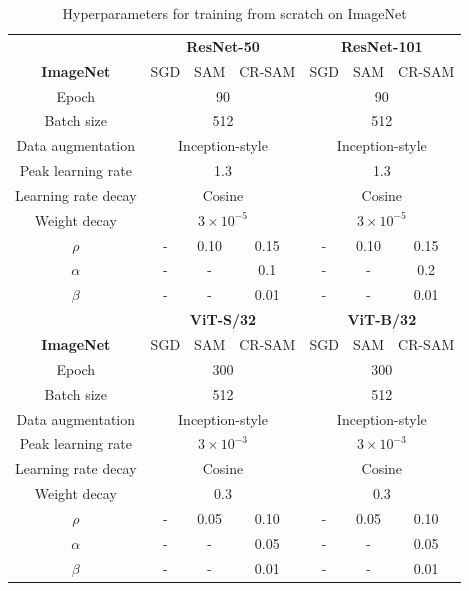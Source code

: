 \documentclass[letterpaper]{article} %
\theoremstyle{plain}
\theoremstyle{definition}
\begin{document}
 \begin{table}[h!]
\caption{\footnotesize Hyperparameters for training from scratch on ImageNet}
  \centering
  \small
  \begin{tabular}{c|ccc|ccc}
  \toprule
     & \multicolumn{3}{c|}{\textbf{ResNet-50 }} & \multicolumn{3}{c}{ \textbf{ResNet-101}} \\
   \textbf{ImageNet }  & SGD & SAM &CR-SAM& SGD & SAM &CR-SAM\\
   \midrule
   Epoch&\multicolumn{3}{c|}{90}&\multicolumn{3}{c}{90}\\
   Batch size&\multicolumn{3}{c|}{512}&\multicolumn{3}{c}{512}\\
   Data augmentation &\multicolumn{3}{c|}{Inception-style}&\multicolumn{3}{c}{Inception-style}\\
   Peak learning rate &\multicolumn{3}{c|}{1.3}&\multicolumn{3}{c}{1.3}\\
   Learning rate decay &\multicolumn{3}{c|}{Cosine}&\multicolumn{3}{c}{Cosine}\\
   Weight decay &\multicolumn{3}{c}{$3\times10^{-5}$}&\multicolumn{3}{c}{$3\times10^{-5}$}\\
   $\rho$ & -&0.10&0.15&-&0.10&0.15\\
   $\alpha$ &-&-&0.1&-&-&0.2\\
   $\beta$ &-&-&0.01&-&-&0.01\\
\midrule
   & \multicolumn{3}{c|}{\textbf{ViT-S/32}} & \multicolumn{3}{c}{ \textbf{ViT-B/32}} \\
   \textbf{ImageNet }  & SGD & SAM &CR-SAM& SGD & SAM &CR-SAM\\
   \midrule
   Epoch&\multicolumn{3}{c|}{300}&\multicolumn{3}{c}{300}\\
   Batch size&\multicolumn{3}{c|}{512}&\multicolumn{3}{c}{512}\\
   Data augmentation &\multicolumn{3}{c|}{Inception-style}&\multicolumn{3}{c}{Inception-style}\\
   Peak learning rate &\multicolumn{3}{c}{$3\times10^{-3}$}&\multicolumn{3}{c}{$3\times10^{-3}$}\\
   Learning rate decay &\multicolumn{3}{c|}{Cosine}&\multicolumn{3}{c}{Cosine}\\
   Weight decay &\multicolumn{3}{c}{0.3}&\multicolumn{3}{c}{0.3}\\
   $\rho$ & -&0.05&0.10&-&0.05&0.10\\
   $\alpha$ &-&-&0.05&-&-&0.05\\
   $\beta$ &-&-&0.01&-&-&0.01\\

    \bottomrule
      
  \end{tabular}
  
  \label{tab:hyper_imgnet}
  \vspace{-0.5em}
\end{table}
\end{document}
